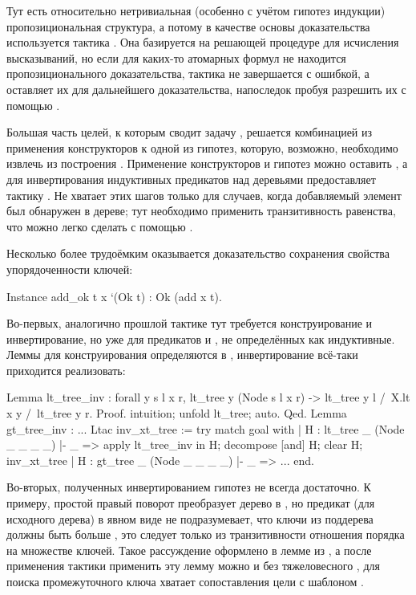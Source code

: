 \documentclass[a4paper,14pt]{extarticle}
\begin{document}
Тут есть относительно нетривиальная
(особенно с учётом гипотез индукции)
пропозициональная структура, а потому
в качестве основы доказательства используется тактика
. Она базируется на решающей процедуре
для исчисления высказываний, но если для каких-то атомарных
формул не находится пропозиционального доказательства,
тактика не завершается с ошибкой, а
оставляет их для дальнейшего доказательства, 
напоследок пробуя разрешить их с помощью
.

Большая часть целей, к которым сводит задачу
,
решается комбинацией из применения конструкторов
 к одной из гипотез,
которую, возможно, необходимо извлечь
из построения .
Применение конструкторов и гипотез
можно оставить ,
а для инвертирования
индуктивных предикатов над деревьями
 предоставляет тактику
.
Не хватает этих шагов только
для случаев, когда добавляемый элемент
был обнаружен в дереве;
тут необходимо применить транзитивность
равенства, что можно легко сделать
с помощью .

Несколько более трудоёмким оказывается доказательство
сохранения свойства упорядоченности ключей:
\begin{coqcode}
Instance add_ok t x `(Ok t) : Ok (add x t).
\end{coqcode}

Во-первых, аналогично прошлой тактике
тут требуется конструирование и инвертирование,
но уже для предикатов
 и ,
не определённых как индуктивные.
Леммы для конструирования определяются в ,
инвертирование всё-таки приходится реализовать:
\begin{coqcode}
Lemma lt_tree_inv : forall y s l x r,
  lt_tree y (Node s l x r) ->
  lt_tree y l /\ X.lt x y /\ lt_tree y r.
Proof. intuition; unfold lt_tree; auto. Qed.
Lemma gt_tree_inv : ...
Ltac inv_xt_tree := try match goal with
  | H : lt_tree _ (Node _ _ _ _) |- _ =>
    apply lt_tree_inv in H;
    decompose [and] H; clear H;
    inv_xt_tree
  | H : gt_tree _ (Node _ _ _ _) |- _ => ...
end.
\end{coqcode}

Во-вторых, полученных инвертированием гипотез не всегда достаточно. 
К примеру, простой правый поворот преобразует дерево
 в ,
но предикат  (для исходного дерева)
в явном виде не подразумевает,
что ключи из поддерева  должны быть больше ,
это следует только из транзитивности отношения порядка на множестве ключей.
Такое рассуждение оформлено в лемме
 из ,
а после применения тактики 
применить эту лемму можно и без тяжеловесного ,
для поиска промежуточного ключа хватает сопоставления цели с шаблоном
.
\end{document}
